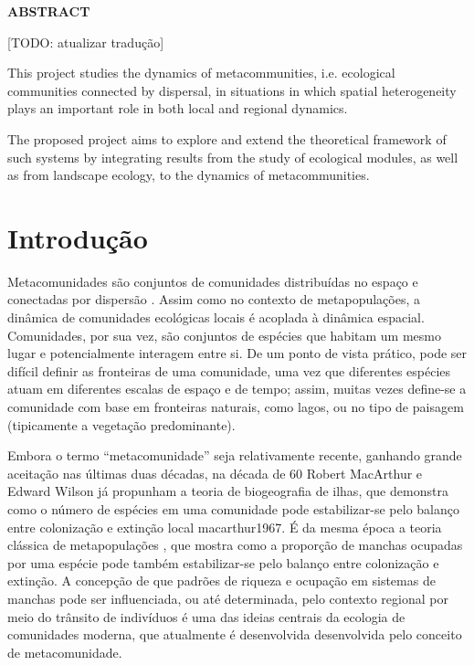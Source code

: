 \documentclass[12pt]{extarticle}
\begin{document}
\newpage

\setlength{\parindent}{20pt}
\thispagestyle{empty}
\begin{center}
    \bf \Large \color{blue} ABSTRACT
\end{center}
\vskip 3.0cm
{\it

    [TODO: atualizar tradução]

    This project studies the dynamics of metacommunities, i.e.
    ecological communities connected by dispersal, in situations in which
    spatial heterogeneity plays an important role in both local and regional
    dynamics.

    The proposed project aims to explore and extend the theoretical framework
    of such systems by integrating results from the study of ecological modules,
    as well as from landscape ecology, to the dynamics of metacommunities.
}

\newpage
\setcounter{page}{1}
\onehalfspacing

\section{Introdução}

Metacomunidades são conjuntos de comunidades distribuídas no espaço e
conectadas por dispersão \citep{hanski1991, holyoak2005}. Assim como no
contexto de metapopulações, a dinâmica de comunidades ecológicas locais é
acoplada à dinâmica espacial.  Comunidades, por sua vez, são conjuntos de
espécies que habitam um mesmo lugar e potencialmente interagem entre si. De um
ponto de vista prático, pode ser difícil definir as fronteiras de uma
comunidade, uma vez que diferentes espécies atuam em diferentes escalas de
espaço e de tempo; assim, muitas vezes define-se a comunidade com base em
fronteiras naturais, como lagos, ou no tipo de paisagem (tipicamente a
vegetação predominante).

Embora o termo ``metacomunidade'' seja relativamente recente, ganhando grande
aceitação nas últimas duas décadas, na década de 60 Robert MacArthur e Edward Wilson
já propunham a
teoria de biogeografia de ilhas, que demonstra como o número de espécies em uma comunidade pode estabilizar-se
pelo balanço entre colonização e extinção local {macarthur1967}. 
É da mesma época a teoria clássica de metapopulações \citep{levins1969,levins1971}, 
que mostra como a proporção de manchas ocupadas por uma espécie pode também estabilizar-se pelo 
balanço entre colonização e extinção.
A concepção de que padrões de riqueza e ocupação em sistemas de manchas pode ser influenciada, ou até
determinada, pelo contexto regional por meio do trânsito de indivíduos 
é uma das ideias centrais da ecologia de
comunidades moderna, que atualmente é desenvolvida desenvolvida pelo conceito de
metacomunidade.
\end{document}
